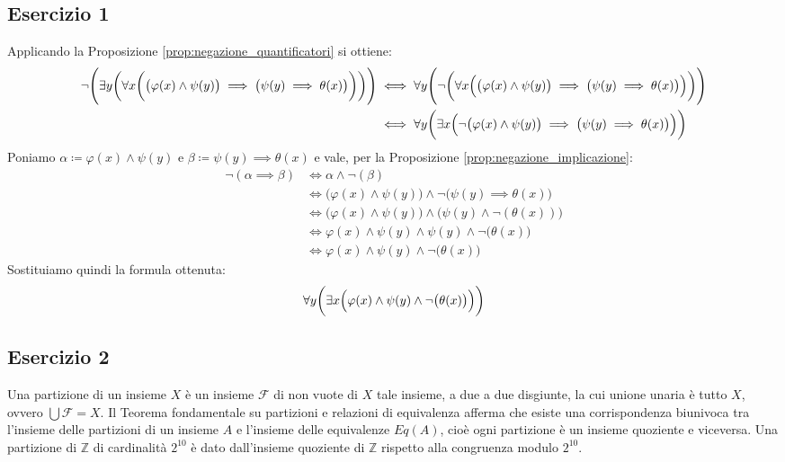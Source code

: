 \subsection*{Esercizio 1}
Applicando la Proposizione \ref{prop:negazione_quantificatori} si ottiene:
\begin{align*}
	\neg \Biggl(\exists y \biggl(\forall x \biggl( \bigl( \varphi(x) \land \psi(y)\bigr)	\implies \bigl(	\psi(y) \implies \theta(x) \bigr)\biggr)\biggr)
	\Biggr) &\iff	\forall y \Biggl(\neg \biggl(\forall x \Bigl( \bigl( \varphi(x) \land \psi(y)		\bigr) \implies \bigl(\psi(y) \implies \theta(x)\bigr)\Bigr) \biggr) \Biggr) \\
	&\iff \forall y 
	\biggl( \exists x \Bigl( \neg  \bigl( \varphi(x) \land \psi(y)\bigr) \implies \bigl(	\psi(y) \implies \theta(x)	\bigr) 	\Bigr)	\biggr) \\
\end{align*}
Poniamo $\alpha \coloneqq \varphi(x) \land \psi(y)$ e $\beta \coloneqq \psi(y) \implies \theta(x)$ e vale, per la Proposizione \ref{prop:negazione_implicazione}:
\begin{align*}
	\neg (\alpha \implies \beta) &\iff \alpha \land \neg (\beta) \\
	&\iff \bigl( \varphi(x) \land \psi(y)\bigr) \land \neg \bigl(\psi(y) \implies \theta(x)\bigr) \\
	&\iff \bigl( \varphi(x) \land \psi(y)\bigr) \land \bigl(\psi(y) \land \neg (\theta(x))\bigr) \\
	&\iff \varphi(x) \land \psi(y) \land \psi(y) \land \neg \bigl(\theta(x)\bigr) \\
	&\iff \varphi(x) \land \psi(y) \land \neg \bigl(\theta(x)\bigr)
\end{align*}
Sostituiamo quindi la formula ottenuta:
\begin{align*}
	\forall y 
	\biggl( \exists x \Bigl( \varphi(x) \land \psi(y) \land \neg \bigl(\theta(x)\bigr)	\Bigr)	\biggr) \\
\end{align*}
\subsection*{Esercizio 2}
Una partizione di un insieme $X$ è un insieme $\mathcal{F}$ di non vuote di $X$ tale insieme, a due a due disgiunte, la cui unione unaria è tutto $X$, ovvero $\bigcup \mathcal{F} = X$. Il Teorema fondamentale su partizioni e relazioni di equivalenza afferma che esiste una corrispondenza biunivoca tra l'insieme delle partizioni di un insieme $A$ e l'insieme delle equivalenze $Eq(A)$, cioè ogni partizione è un insieme quoziente e viceversa. Una partizione di $\mathbb{Z}$ di cardinalità $2^{10}$ è dato dall'insieme quoziente di $\mathbb{Z}$ rispetto alla congruenza modulo $2^{10}$.
